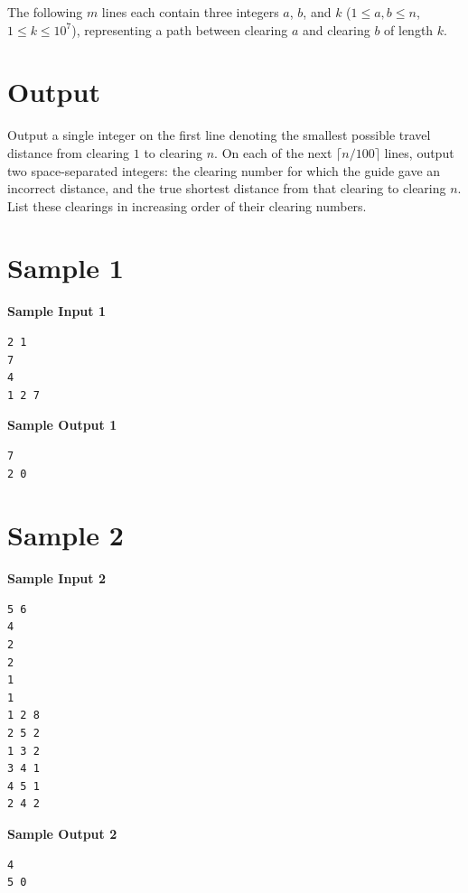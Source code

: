 \documentclass[11pt]{article}
\begin{document}
The following $m$ lines each contain three integers $a$, $b$, and $k$ ($1 \le a, b \le n$, $1 \le k \le 10^7$), representing a path between clearing $a$ and clearing $b$ of length $k$.

\section*{Output}

Output a single integer on the first line denoting the smallest possible travel distance from clearing $1$ to clearing $n$. On each of the next $\lceil n / 100 \rceil$ lines, output two space-separated integers: the clearing number for which the guide gave an incorrect distance, and the true shortest distance from that clearing to clearing $n$. List these clearings in increasing order of their clearing numbers.

\section*{Sample 1}
\noindent
\begin{minipage}[t]{0.48\textwidth}
\textbf{Sample Input 1}
\begin{verbatim}
2 1
7
4
1 2 7
\end{verbatim}
\end{minipage}\hfill
\begin{minipage}[t]{0.48\textwidth}
\textbf{Sample Output 1}
\begin{verbatim}
7
2 0
\end{verbatim}
\end{minipage}

\section*{Sample 2}
\noindent
\begin{minipage}[t]{0.48\textwidth}
\textbf{Sample Input 2}
\begin{verbatim}
5 6
4
2
2
1
1
1 2 8
2 5 2
1 3 2
3 4 1
4 5 1
2 4 2
\end{verbatim}
\end{minipage}\hfill
\begin{minipage}[t]{0.48\textwidth}
\textbf{Sample Output 2}
\begin{verbatim}
4
5 0
\end{verbatim}
\end{minipage}
\end{document}
